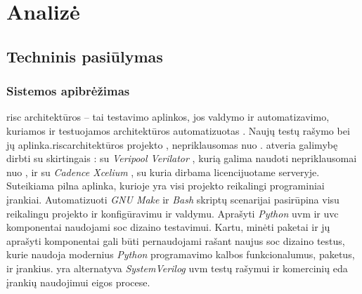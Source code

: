 \section{Analizė}\label{section:analysis}

\subsection{Techninis pasiūlymas}

\subsubsection{Sistemos apibrėžimas}

\gls{risc} architektūros    -- tai testavimo aplinkos, jos valdymo ir automatizavimo, kuriamos ir testuojamos architektūros automatizuotas . Naujų testų rašymo bei jų  aplinka.\gls{risc}architektūros  projekto , nepriklausomas nuo .  atveria galimybę dirbti su skirtingais : su \textit{Veripool Verilator} , kurią galima naudoti nepriklausomai nuo , ir su \textit{Cadence Xcelium} , su kuria dirbama licencijuotame serveryje. Suteikiama pilna  aplinka, kurioje yra visi projekto  reikalingi programiniai įrankiai. Automatizuoti \textit{GNU Make} ir \textit{Bash} skriptų scenarijai pasirūpina visu reikalingu projekto ir   konfigūravimu ir valdymu. Aprašyti \textit{Python} \gls{uvm} ir \gls{uvc} komponentai naudojami \gls{soc} dizaino testavimui. Kartu, minėti paketai ir jų aprašyti komponentai gali būti pernaudojami rašant naujus \gls{soc} dizaino testus, kurie naudoja modernius \textit{Python} programavimo kalbos funkcionalumus, paketus, ir  įrankius.  yra  alternatyva \textit{SystemVerilog} \gls{uvm}  testų rašymui ir komercinių \gls{eda} įrankių naudojimui  eigos procese.


